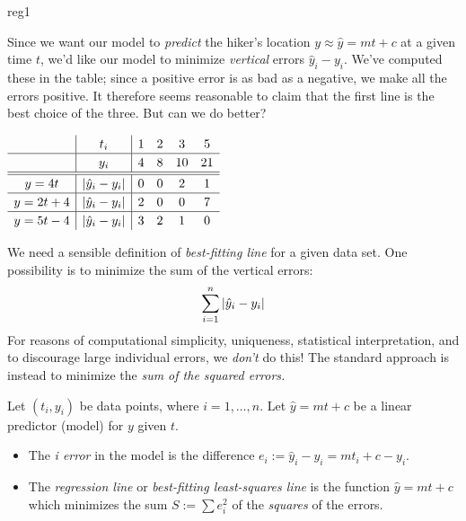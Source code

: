 \begin{example}{}{reg1}
\begin{minipage}[t]{0.59\linewidth}\vspace{-10pt}
Since we want our model to \emph{predict} the hiker's location $y\approx \hat y=mt+c$ at a given time $t$, we'd like our model to minimize \emph{vertical} errors $\hat y_i-y_i$. We've computed these in the table; since a positive error is as bad as a negative, we make all the errors positive. It therefore seems reasonable to claim that the first line is the best choice of the three.\smallbreak
But can we do better?
\end{minipage}\hfill\begin{minipage}[t]{0.4\linewidth}\vspace{0pt}
\flushright $\def\arraystretch{1.2}
\begin{array}[t]{c|c|ccccc}
&t_i&1&2&3&5\\\hline
&y_i&4&8&10&21\\\hline\hline
y=4t&\nm{\hat y_i-y_i}&0&0&2&1\\\hline
y=2t+4&\nm{\hat y_i-y_i}&2&0&0&7\\\hline
y=5t-4&\nm{\hat y_i-y_i}&3&2&1&0
\end{array}$
\end{minipage}
\end{example}


\goodbreak

We need a sensible definition of \emph{best-fitting line} for a given data set. One possibility is to minimize the sum of the vertical errors:
\[\sum_{i=1}^n\left| \hat y_i-y_i\right|\]
For reasons of computational simplicity, uniqueness, statistical interpretation, and to discourage large individual errors, we \emph{don't} do this! The standard approach is instead to minimize the \emph{sum of the squared errors.}


\begin{defn}{}{}
Let $(t_i,y_i)$ be data points, where $i=1,\ldots,n$. Let $\hat y=mt+c$ be a linear predictor (model) for $y$ given $t$.
\begin{itemize}\itemsep0pt
  \item The \emph{i\th{} error} in the model is the difference $e_i:=\hat y_i-y_i=mt_i+c-y_i$.
  \item The \emph{regression line} or \emph{best-fitting least-squares line} is the function $\hat y=mt+c$ which minimizes the sum $S:=\sum e_i^2$ of the \emph{squares} of the errors.
\end{itemize}
\end{defn}


